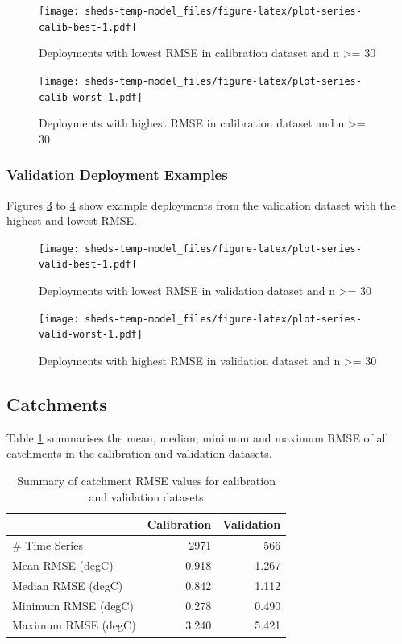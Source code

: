 \documentclass[
]{book}
\begin{document}
\begin{figure}
\centering
\texttt{[image: sheds-temp-model\_files/figure-latex/plot-series-calib-best-1.pdf]}
\caption{\label{fig:plot-series-calib-best}Deployments with lowest RMSE in calibration dataset and n \textgreater= 30}
\end{figure}

\begin{figure}
\centering
\texttt{[image: sheds-temp-model\_files/figure-latex/plot-series-calib-worst-1.pdf]}
\caption{\label{fig:plot-series-calib-worst}Deployments with highest RMSE in calibration dataset and n \textgreater= 30}
\end{figure}

\subsubsection{Validation Deployment Examples}\label{validation-deployment-examples}

Figures \ref{fig:plot-series-valid-best} to \ref{fig:plot-series-valid-worst} show example deployments from the validation dataset with the highest and lowest RMSE.

\begin{figure}
\centering
\texttt{[image: sheds-temp-model\_files/figure-latex/plot-series-valid-best-1.pdf]}
\caption{\label{fig:plot-series-valid-best}Deployments with lowest RMSE in validation dataset and n \textgreater= 30}
\end{figure}

\begin{figure}
\centering
\texttt{[image: sheds-temp-model\_files/figure-latex/plot-series-valid-worst-1.pdf]}
\caption{\label{fig:plot-series-valid-worst}Deployments with highest RMSE in validation dataset and n \textgreater= 30}
\end{figure}

\subsection{Catchments}\label{catchments}

Table \ref{tab:table-gof-catchment} summarises the mean, median, minimum and maximum RMSE of all catchments in the calibration and validation datasets.

\begin{table}

\caption{\label{tab:table-gof-catchment}Summary of catchment RMSE values for calibration and validation datasets}
\centering
\begin{tabular}[t]{l|r|r}
\hline
 & Calibration & Validation\\
\hline
\# Time Series & 2971 & 566\\
\hline
Mean RMSE (degC) & 0.918 & 1.267\\
\hline
Median RMSE (degC) & 0.842 & 1.112\\
\hline
Minimum RMSE (degC) & 0.278 & 0.490\\
\hline
Maximum RMSE (degC) & 3.240 & 5.421\\
\hline
\end{tabular}
\end{table}
\end{document}
